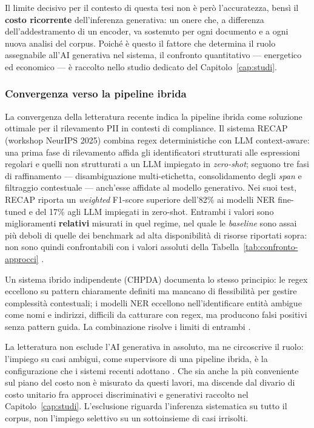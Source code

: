 Il limite decisivo per il contesto di questa tesi non è però l'accuratezza, bensì il \textbf{costo ricorrente} dell'inferenza generativa: un onere che, a differenza dell'addestramento di un encoder, va sostenuto per ogni documento e a ogni nuova analisi del corpus. Poiché è questo il fattore che determina il ruolo assegnabile all'AI generativa nel sistema, il confronto quantitativo --- energetico ed economico --- è raccolto nello studio dedicato del Capitolo~\ref{cap:studi}.

\subsubsection*{Convergenza verso la pipeline ibrida}

La convergenza della letteratura recente indica la pipeline ibrida come soluzione ottimale per il rilevamento PII in contesti di compliance. Il sistema RECAP (workshop NeurIPS 2025) combina regex deterministiche con LLM context-aware: una prima fase di rilevamento affida gli identificatori strutturati alle espressioni regolari e quelli non strutturati a un LLM impiegato in \textit{zero-shot}; seguono tre fasi di raffinamento --- disambiguazione multi-etichetta, consolidamento degli \textit{span} e filtraggio contestuale --- anch'esse affidate al modello generativo. Nei suoi test, RECAP riporta un \textit{weighted} F1-score superiore dell'82\% ai modelli NER fine-tuned e del 17\% agli LLM impiegati in zero-shot. Entrambi i valori sono miglioramenti \textbf{relativi} misurati in quel regime, nel quale le \textit{baseline} sono assai più deboli di quelle dei benchmark ad alta disponibilità di risorse riportati sopra: non sono quindi confrontabili con i valori assoluti della Tabella~\ref{tab:confronto-approcci}
\cite{rajgarhiaEvaluationStudyHybrid2025}. %

Un sistema ibrido indipendente (CHPDA) documenta lo stesso principio: le regex eccellono su pattern chiaramente definiti ma mancano di flessibilità per gestire complessità contestuali; i modelli NER eccellono nell'identificare entità ambigue come nomi e indirizzi, difficili da catturare con regex, ma producono falsi positivi senza pattern guida. La combinazione risolve i limiti di entrambi
\cite{koliDecodingComplexityIntelligent2025}. %

La letteratura non esclude l'AI generativa in assoluto, ma ne circoscrive il ruolo: l'impiego su casi ambigui, come supervisore di una pipeline ibrida, è la configurazione che i sistemi recenti adottano
\cite{rajgarhiaEvaluationStudyHybrid2025}. Che sia anche la più conveniente sul piano del costo non è misurato da questi lavori, ma discende dal divario di costo unitario fra approcci discriminativi e generativi raccolto nel Capitolo~\ref{cap:studi}. L'esclusione riguarda l'inferenza sistematica su tutto il corpus, non l'impiego selettivo su un sottoinsieme di casi irrisolti.

